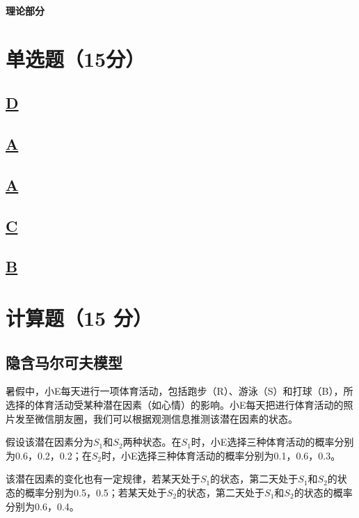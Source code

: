 \documentclass[a4paper]{article}
\begin{document}
\courseheader
{}
\vspace{3mm}
\centerline{\textbf{\Large{理论部分}}}

\section{单选题（15分）}
\subsection{\underline{D}}

\subsection{\underline{A}}

\subsection{\underline{A}}

\subsection{\underline{C}}

\subsection{\underline{B}}

\section{计算题（15 分）}
\subsection{隐含马尔可夫模型}

\hspace{2em}暑假中，小E每天进行一项体育活动，包括跑步（R）、游泳（S）和打球（B），所选择的体育活动受某种潜在因素（如心情）的影响。小E每天把进行体育活动的照片发至微信朋友圈，我们可以根据观测信息推测该潜在因素的状态。

\hspace{2em}假设该潜在因素分为$S_1$和$S_2$两种状态。在$S_1$时，小E选择三种体育活动的概率分别为0.6，0.2，0.2；在$S_2$时，小E选择三种体育活动的概率分别为0.1，0.6，0.3。

\hspace{2em}该潜在因素的变化也有一定规律，若某天处于$S_1$的状态，第二天处于$S_1$和$S_2$的状态的概率分别为0.5，0.5；若某天处于$S_2$的状态，第二天处于$S_1$和$S_2$的状态的概率分别为0.6，0.4。
\end{document}
